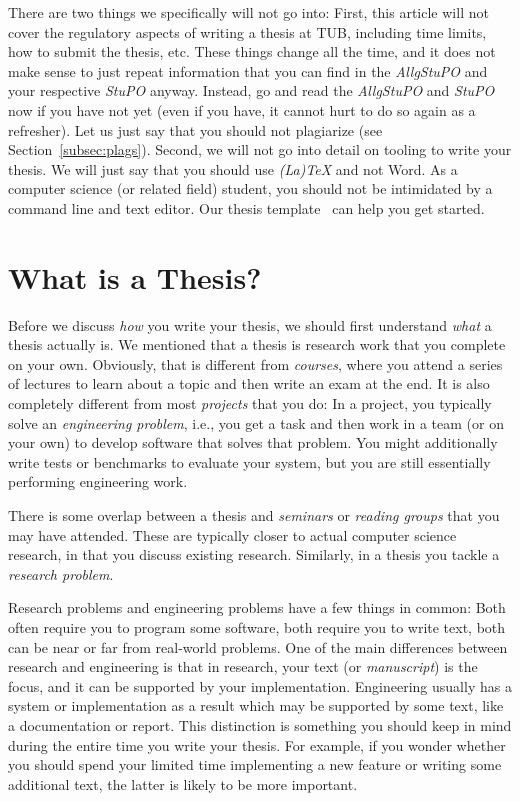 \documentclass[a4paper]{article}
\begin{document}
There are two things we specifically will not go into:
First, this article will not cover the regulatory aspects of writing a thesis at TUB, including time limits, how to submit the thesis, etc.
These things change all the time, and it does not make sense to just repeat information that you can find in the \emph{AllgStuPO} and your respective \emph{StuPO} anyway.
Instead, go and read the \emph{AllgStuPO} and \emph{StuPO} now if you have not yet (even if you have, it cannot hurt to do so again as a refresher).
Let us just say that you should not plagiarize (see Section~\ref{subsec:plags}).
Second, we will not go into detail on tooling to write your thesis.
We will just say that you should use \emph{(La)TeX} and not Word.
As a computer science (or related field) student, you should not be intimidated by a command line and text editor.
Our thesis template~\cite{thesis-template} can help you get started.

\section{What is a Thesis?}
\label{sec:what}

Before we discuss \emph{how} you write your thesis, we should first understand \emph{what} a thesis actually is.
We mentioned that a thesis is research work that you complete on your own.
Obviously, that is different from \emph{courses}, where you attend a series of lectures to learn about a topic and then write an exam at the end.
It is also completely different from most \emph{projects} that you do:
In a project, you typically solve an \emph{engineering problem}, i.e., you get a task and then work in a team (or on your own) to develop software that solves that problem.
You might additionally write tests or benchmarks to evaluate your system, but you are still essentially performing engineering work.

There is some overlap between a thesis and \emph{seminars} or \emph{reading groups} that you may have attended.
These are typically closer to actual computer science research, in that you discuss existing research.
Similarly, in a thesis you tackle a \emph{research problem}.

Research problems and engineering problems have a few things in common:
Both often require you to program some software, both require you to write text, both can be near or far from real-world problems.
One of the main differences between research and engineering is that in research, your text (or \emph{manuscript}) is the focus, and it can be supported by your implementation.
Engineering usually has a system or implementation as a result which may be supported by some text, like a documentation or report.
This distinction is something you should keep in mind during the entire time you write your thesis.
For example, if you wonder whether you should spend your limited time implementing a new feature or writing some additional text, the latter is likely to be more important.
\end{document}
